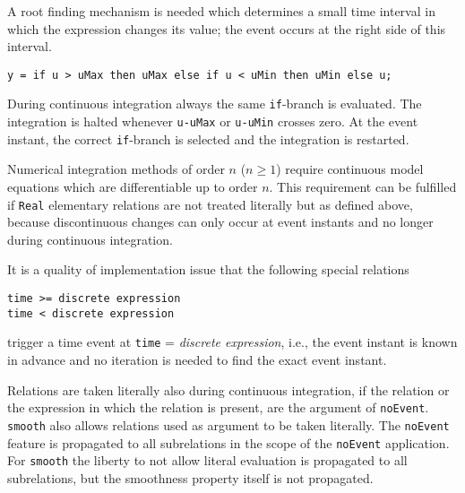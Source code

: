 \begin{nonnormative}
A root finding mechanism is needed which determines a small time interval in which the expression changes its value; the event occurs at the right side of this interval.
\end{nonnormative}

\begin{example}
\begin{lstlisting}[language=modelica]
y = if u > uMax then uMax else if u < uMin then uMin else u;
\end{lstlisting}

During continuous integration always the same \lstinline!if!-branch is evaluated.
The integration is halted whenever \lstinline!u-uMax! or \lstinline!u-uMin! crosses zero.
At the event instant, the correct \lstinline!if!-branch is selected and the integration is restarted.

Numerical integration methods of order $n$ ($n \geq 1$) require continuous model equations which are differentiable up to order $n$.
This requirement can be fulfilled if \lstinline!Real! elementary relations are not treated literally but as defined above, because discontinuous changes can only occur at event instants and no longer during continuous integration.
\end{example}

\begin{nonnormative}
It is a quality of implementation issue that the following special relations
\begin{lstlisting}[language=modelica]
time >= discrete expression
time < discrete expression
\end{lstlisting}
trigger a time event at \lstinline!time! = \emph{discrete expression}, i.e., the event instant is known in advance and no iteration is needed to find the exact event instant.
\end{nonnormative}

Relations are taken literally also during continuous integration, if the relation or the expression in which the relation is present, are the argument of \lstinline!noEvent!.
\lstinline!smooth! also allows relations used as argument to be taken literally.
The \lstinline!noEvent! feature is propagated to all subrelations in the scope of the \lstinline!noEvent! application.
For \lstinline!smooth! the liberty to not allow literal evaluation is propagated to all subrelations, but the smoothness property itself is not propagated.

